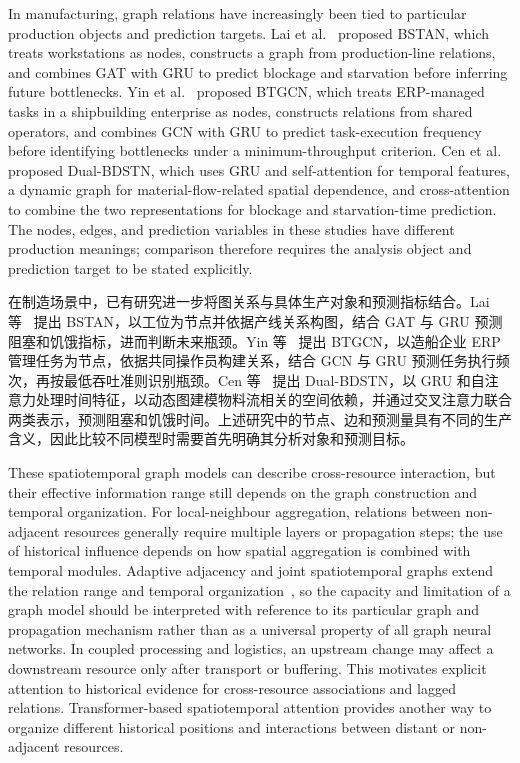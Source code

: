 \documentclass[a4paper,fleqn]{cas-dc}
\newcommand{\zhpara}[1]{%
  \par\begingroup\small\color{black!72}\noindent #1\par\endgroup}
\begin{document}
In manufacturing, graph relations have increasingly been tied to particular production objects and prediction targets. Lai et al.~\cite{lai2023bstan} proposed BSTAN, which treats workstations as nodes, constructs a graph from production-line relations, and combines GAT with GRU to predict blockage and starvation before inferring future bottlenecks. Yin et al.~\cite{yin2025btgcn} proposed BTGCN, which treats ERP-managed tasks in a shipbuilding enterprise as nodes, constructs relations from shared operators, and combines GCN with GRU to predict task-execution frequency before identifying bottlenecks under a minimum-throughput criterion. Cen et al.~\cite{cen2025dstnn} proposed Dual-BDSTN, which uses GRU and self-attention for temporal features, a dynamic graph for material-flow-related spatial dependence, and cross-attention to combine the two representations for blockage and starvation-time prediction. The nodes, edges, and prediction variables in these studies have different production meanings; comparison therefore requires the analysis object and prediction target to be stated explicitly.

\zhpara{在制造场景中，已有研究进一步将图关系与具体生产对象和预测指标结合。Lai 等~\cite{lai2023bstan} 提出 BSTAN，以工位为节点并依据产线关系构图，结合 GAT 与 GRU 预测阻塞和饥饿指标，进而判断未来瓶颈。Yin 等~\cite{yin2025btgcn} 提出 BTGCN，以造船企业 ERP 管理任务为节点，依据共同操作员构建关系，结合 GCN 与 GRU 预测任务执行频次，再按最低吞吐准则识别瓶颈。Cen 等~\cite{cen2025dstnn} 提出 Dual-BDSTN，以 GRU 和自注意力处理时间特征，以动态图建模物料流相关的空间依赖，并通过交叉注意力联合两类表示，预测阻塞和饥饿时间。上述研究中的节点、边和预测量具有不同的生产含义，因此比较不同模型时需要首先明确其分析对象和预测目标。}

These spatiotemporal graph models can describe cross-resource interaction, but their effective information range still depends on the graph construction and temporal organization. For local-neighbour aggregation, relations between non-adjacent resources generally require multiple layers or propagation steps; the use of historical influence depends on how spatial aggregation is combined with temporal modules. Adaptive adjacency and joint spatiotemporal graphs extend the relation range and temporal organization~\cite{wu2019graphwavenet,song2020stsgcn}, so the capacity and limitation of a graph model should be interpreted with reference to its particular graph and propagation mechanism rather than as a universal property of all graph neural networks. In coupled processing and logistics, an upstream change may affect a downstream resource only after transport or buffering. This motivates explicit attention to historical evidence for cross-resource associations and lagged relations. Transformer-based spatiotemporal attention provides another way to organize different historical positions and interactions between distant or non-adjacent resources.
\end{document}

